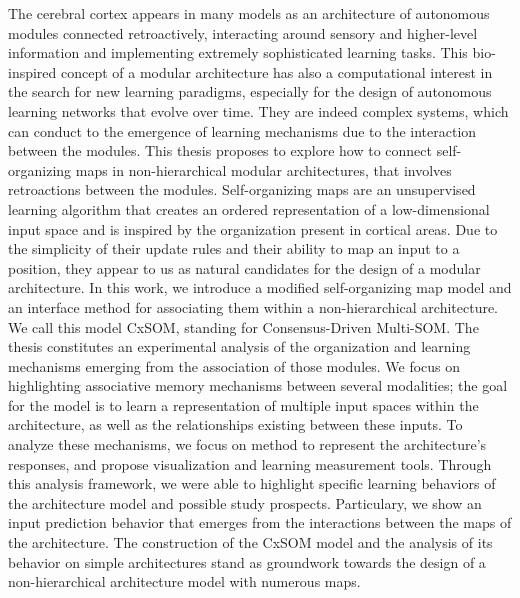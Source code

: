 \documentclass[11pt]{thesul-cs}
\begin{document}
\begin{ThesisAbstract}
\begin{FrenchAbstract}
  \end{FrenchAbstract}

  \begin{EnglishAbstract}
    The cerebral cortex appears in many models as an architecture of autonomous modules connected retroactively, interacting around sensory and higher-level information and implementing extremely sophisticated learning tasks. 
    This bio-inspired concept of a modular architecture has also a computational interest in the search for new learning paradigms, especially for the design of autonomous learning networks that evolve over time. They are indeed complex systems, which can conduct to the emergence of learning mechanisms due to the interaction between the modules.
    This thesis proposes to explore how to connect self-organizing maps in non-hierarchical modular architectures, that involves retroactions between the modules. 
    Self-organizing maps are an unsupervised learning algorithm that creates an ordered representation of a low-dimensional input space and is inspired by the organization present in cortical areas. 
    Due to the simplicity of their update rules and their ability to map an input to a position, they appear to us as natural candidates for the design of a modular architecture.
    In this work, we introduce a modified self-organizing map model and an interface method for associating them within a non-hierarchical architecture. We call this model CxSOM, standing for Consensus-Driven Multi-SOM.
    The thesis constitutes an experimental analysis of the organization and learning mechanisms emerging from the association of those modules. 
    We focus on highlighting associative memory mechanisms between several modalities; the goal for the model is to learn a representation of multiple input spaces within the architecture, as well as the relationships existing between these inputs.
    To analyze these mechanisms, we focus on method to represent the architecture's responses, and propose visualization and learning measurement tools. Through this analysis framework, we were able to highlight specific learning behaviors of the architecture model and possible study prospects. Particulary, we show an input prediction behavior that emerges from the interactions between the maps of the architecture.
    The construction of the CxSOM model and the analysis of its behavior on simple architectures stand as  groundwork towards the design of a non-hierarchical architecture model with numerous maps.
   
    \end{EnglishAbstract}
  \end{ThesisAbstract}
\end{document}
